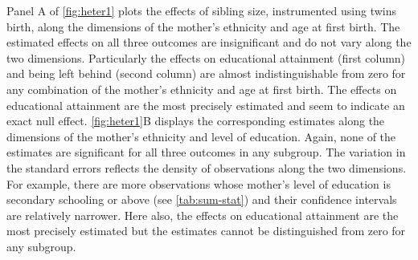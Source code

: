 Panel A of \autoref{fig:heter1} plots the effects of sibling size, instrumented using twins birth, along the dimensions of the mother's ethnicity and age at first birth. The estimated effects on all three outcomes are insignificant and do not vary along the two dimensions. Particularly the effects on educational attainment (first column) and being left behind (second column) are almost indistinguishable from zero for any combination of the mother's ethnicity and age at first birth. The effects on educational attainment are the most precisely estimated and seem to indicate an exact null effect. \autoref{fig:heter1}B displays the corresponding estimates along the dimensions of the mother's ethnicity and level of education. Again, none of the estimates are significant for all three outcomes in any subgroup. The variation in the standard errors reflects the density of observations along the two dimensions. For example, there are more observations whose mother’s level of education is secondary schooling or above (see \autoref{tab:sum-stat}) and their confidence intervals are relatively narrower. Here also, the effects on educational attainment are the most precisely estimated but the estimates cannot be distinguished from zero for any subgroup. 

%

